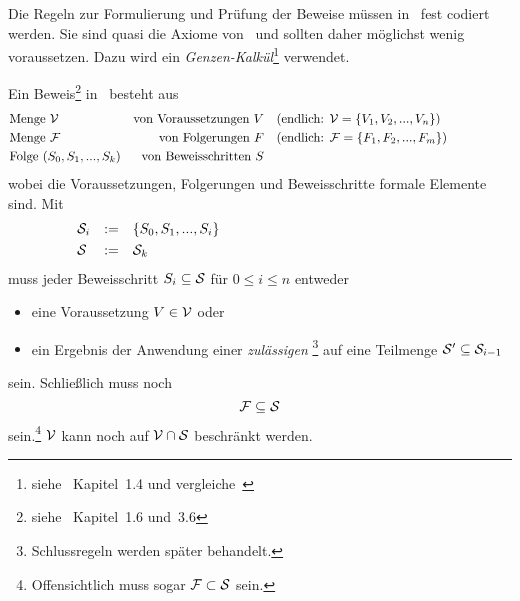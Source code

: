 Die Regeln zur Formulierung und Prüfung der Beweise müssen in \ASBA\ fest codiert werden.
Sie sind quasi die Axiome von \ASBA\ und sollten daher möglichst wenig voraussetzen.
Dazu wird ein \emph{Genzen-Kalkül}\footnote{%
	siehe~\cite{bib:Rautenberg} Kapitel~1.4 und vergleiche~\cite{bib:Schlussregel,bib:NatuerlichesSchliessen}%
} verwendet.

Ein Beweis\footnote{%
	siehe~\cite{bib:Rautenberg} Kapitel~1.6 und~3.6%
} in \ASBA\ besteht aus
\begin{align}
	& \text{Menge } \mathcal{V}
	& \text{von Voraussetzungen } V
	& \quad (\text{endlich: } \mathcal{V} = \{V_1, V_2, ..., V_n\})
	\label{def:Voraussetzungen}
	\\
	& \text{Menge } \mathcal{F}
	& \text{von Folgerungen } F
	& \quad (\text{endlich: } \mathcal{F} = \{F_1, F_2, ..., F_m\})
	\label{def:Folgerungen}
	\\
	& \text{Folge } (S_0, S_1, ..., S_k)
	& \text{von Beweisschritten } S
	\label{def:Beweisfolge}
	&&&&&&&&&&
\end{align}
wobei die Voraussetzungen, Folgerungen und Beweisschritte formale Elemente sind.
Mit
\begin{align}
	& \mathcal{S}_i & \operatorname{:\!\operatorname{=}} \quad & \{S_0, S_1, ..., S_i\}
	\label{def:Beweisschrittebis}
	\\
	& \mathcal{S}   & \operatorname{:\!\operatorname{=}} \quad & \mathcal{S}_k
	\label{def:Beweisschritte}
	&&&&&&&&&&&&&&&&&&&&&&&&&&&&&&
\end{align}
muss jeder Beweisschritt $S_i \subseteq \mathcal{S} $ für $0 \le i \le n$ entweder

\begin{itemize}
	\item[] eine Voraussetzung $V \in \mathcal{V}$ oder
	\item[] ein Ergebnis der Anwendung einer \emph{zulässigen }\footnote{%
		Schlussregeln werden später behandelt.%
	} auf eine Teilmenge $\mathcal{S}' \subseteq \mathcal{S}_{i-1}$
\end{itemize}
sein.
Schließlich muss noch
\[
	\mathcal{F} \subseteq \mathcal{S}
\]
sein.\footnote{Offensichtlich muss sogar $\mathcal{F} \subset \mathcal{S}$ sein.}
$\mathcal{V}$ kann noch auf $\mathcal{V} \cap \mathcal{S}$ beschränkt werden.

